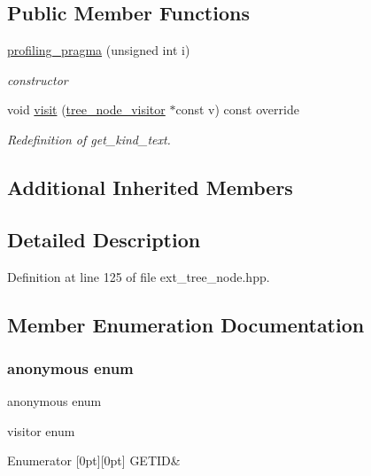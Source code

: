 \subsection*{Public Member Functions}
\begin{DoxyCompactItemize}
\item 
\hyperlink{structprofiling__pragma_a61742688d18ab286f44773b411b277fb}{profiling\+\_\+pragma} (unsigned int i)
\begin{DoxyCompactList}\small\item\em constructor \end{DoxyCompactList}\item 
void \hyperlink{structprofiling__pragma_aa8bba94f73c0ad5b71140ac6fc79eb57}{visit} (\hyperlink{classtree__node__visitor}{tree\+\_\+node\+\_\+visitor} $\ast$const v) const override
\begin{DoxyCompactList}\small\item\em Redefinition of get\+\_\+kind\+\_\+text. \end{DoxyCompactList}\end{DoxyCompactItemize}
\subsection*{Additional Inherited Members}


\subsection{Detailed Description}


Definition at line 125 of file ext\+\_\+tree\+\_\+node.\+hpp.



\subsection{Member Enumeration Documentation}
\mbox{\label{structprofiling__pragma_ac2a8a89c5169261ac20d41bdcfc350c7}} 
\subsubsection{\texorpdfstring{anonymous enum}{anonymous enum}}
{\footnotesize\ttfamily anonymous enum}



visitor enum 

\begin{DoxyEnumFields}{Enumerator}
[0pt][0pt]{}\mbox{\label{structprofiling__pragma_ac2a8a89c5169261ac20d41bdcfc350c7a37c6e3d25ab82e515f7fde6b57a631c5}} 
G\+E\+T\+ID&\\
\hline

\end{DoxyEnumFields}



